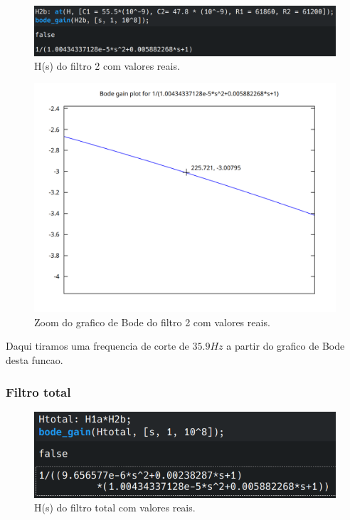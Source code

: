 \documentclass[12pt,twoside, a4paper, twocolumn]{article}
\begin{document}
\begin{figure}[h]
    \centering
    \includegraphics[width=1\columnwidth]{images/hsfiltro2.png}
    \caption{H(s) do filtro 2 com valores reais.}
\end{figure}

\begin{figure}[h]
    \centering
    \includegraphics[width=1\columnwidth]{images/zoomH2.png}
    \caption{Zoom do grafico de Bode do filtro 2 com valores reais.}
\end{figure}

Daqui tiramos uma frequencia de corte de $35.9Hz$ a partir do grafico de Bode desta funcao.


\pagebreak
\subsubsection{Filtro total}

\begin{figure}[h]
    \centering
    \includegraphics[width=1\columnwidth]{images/hsfiltrototal.png}
    \caption{H(s) do filtro total com valores reais.}
\end{figure}
\end{document}
